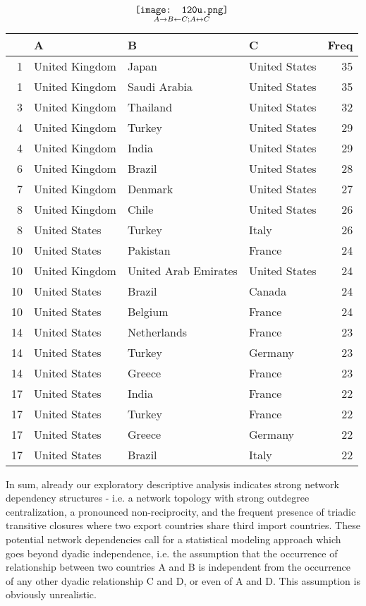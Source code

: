 \documentclass[12pt, letterpaper]{article}
\numberwithin{equation}{section}
\begin{document}
\begin{table}[t]
 \scriptsize
\caption{ $\underset{A \rightarrow B  \leftarrow C ; A \leftrightarrow C}{\protect\texttt{[image: 120u.png]}}$}
\label{triad2}
\centering
\begin{tabular}{rlllr}
  \hline
 & A & B & C & Freq \\ 
  \hline
1 & United Kingdom & Japan & United States &  35 \\ 
  1 & United Kingdom & Saudi Arabia & United States &  35 \\ 
  3 & United Kingdom & Thailand & United States &  32 \\ 
  4 & United Kingdom & Turkey & United States &  29 \\ 
  4 & United Kingdom & India & United States &  29 \\ 
  6 & United Kingdom & Brazil & United States &  28 \\ 
  7 & United Kingdom & Denmark & United States &  27 \\ 
  8 & United Kingdom & Chile & United States &  26 \\ 
  8 & United States & Turkey & Italy &  26 \\ 
  10 & United States & Pakistan & France &  24 \\ 
  10 & United Kingdom & United Arab Emirates & United States &  24 \\ 
  10 & United States & Brazil & Canada &  24 \\ 
  10 & United States & Belgium & France &  24 \\ 
  14 & United States & Netherlands & France &  23 \\ 
  14 & United States & Turkey & Germany &  23 \\ 
  14 & United States & Greece & France &  23 \\
  17 & United States & India & France &  22 \\ 
  17 & United States & Turkey & France &  22 \\ 
  17 & United States & Greece & Germany &  22 \\ 
  17 & United States & Brazil & Italy &  22 \\ 
   \hline
\end{tabular}

\end{table}
In sum, already our exploratory descriptive analysis indicates strong network dependency structures - i.e. a network topology with strong outdegree centralization, a pronounced non-reciprocity, and the frequent presence of triadic transitive closures where two export countries share third import countries. These potential network dependencies call for a statistical modeling approach which goes beyond dyadic independence, i.e. the assumption that the occurrence of relationship between two countries A and B is independent from the occurrence of any other dyadic relationship C and D, or even of A and D. This assumption is obviously unrealistic.  
\end{document}
